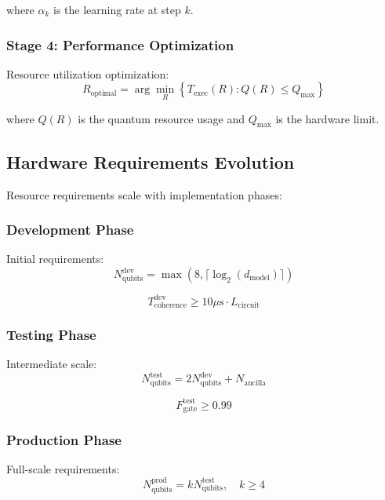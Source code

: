 \documentclass{article}
\begin{document}
where $\alpha_k$ is the learning rate at step $k$.

\subsubsection{Stage 4: Performance Optimization}
Resource utilization optimization:
\begin{equation}
R_{\text{optimal}} = \arg\min_R \left\{T_{\text{exec}}(R) : Q(R) \leq Q_{\text{max}}\right\}
\end{equation}

where $Q(R)$ is the quantum resource usage and $Q_{\text{max}}$ is the hardware limit.

\subsection{Hardware Requirements Evolution}
Resource requirements scale with implementation phases:

\subsubsection{Development Phase}
Initial requirements:
\begin{equation}
N_{\text{qubits}}^{\text{dev}} = \max(8, \lceil\log_2(d_{\text{model}})\rceil)
\end{equation}

\begin{equation}
T_{\text{coherence}}^{\text{dev}} \geq 10\mu\text{s} \cdot L_{\text{circuit}}
\end{equation}

\subsubsection{Testing Phase}
Intermediate scale:
\begin{equation}
N_{\text{qubits}}^{\text{test}} = 2N_{\text{qubits}}^{\text{dev}} + N_{\text{ancilla}}
\end{equation}

\begin{equation}
F_{\text{gate}}^{\text{test}} \geq 0.99
\end{equation}

\subsubsection{Production Phase}
Full-scale requirements:
\begin{equation}
N_{\text{qubits}}^{\text{prod}} = kN_{\text{qubits}}^{\text{test}}, \quad k \geq 4
\end{equation}
\end{document}
